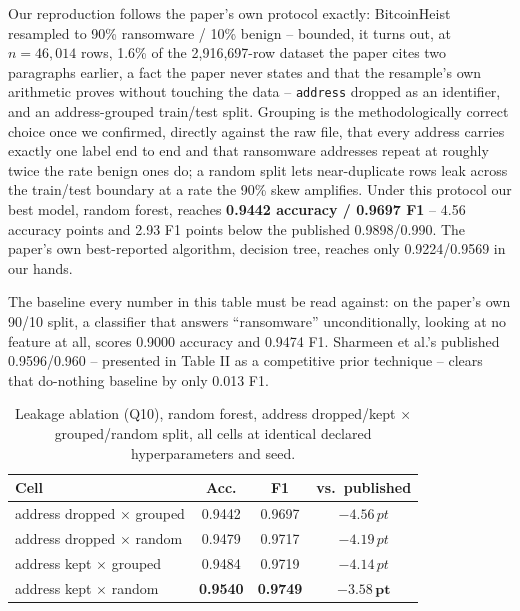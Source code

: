 \documentclass[conference]{IEEEtran}
\newcommand{\pt}{\,pt}
\begin{document}
Our reproduction follows the paper's own protocol exactly: BitcoinHeist resampled to 90\%
ransomware / 10\% benign -- bounded, it turns out, at $n=46{,}014$ rows, 1.6\% of the
2{,}916{,}697-row dataset the paper cites two paragraphs earlier, a fact the paper never states
and that the resample's own arithmetic proves without touching the data -- \texttt{address}
dropped as an identifier, and an address-grouped train/test split. Grouping is the
methodologically correct choice once we confirmed, directly against the raw file, that every
address carries exactly one label end to end and that ransomware addresses repeat at roughly
twice the rate benign ones do; a random split lets near-duplicate rows leak across the train/test
boundary at a rate the 90\% skew amplifies. Under this protocol our best model, random forest,
reaches \textbf{0.9442 accuracy / 0.9697 F1} -- 4.56 accuracy points and 2.93 F1 points below the
published 0.9898/0.990. The paper's own best-reported algorithm, decision tree, reaches only
0.9224/0.9569 in our hands.

The baseline every number in this table must be read against: on the paper's own 90/10 split, a
classifier that answers ``ransomware'' unconditionally, looking at no feature at all, scores
0.9000 accuracy and 0.9474 F1. Sharmeen et al.'s published 0.9596/0.960 -- presented in Table II
as a competitive prior technique -- clears that do-nothing baseline by only 0.013 F1.

\begin{table}[t]
\centering
\caption{Leakage ablation (Q10), random forest, address dropped/kept $\times$ grouped/random
split, all cells at identical declared hyperparameters and seed.}
\label{tab:q10}
\footnotesize
\begin{tabular}{lccc}
\hline
\textbf{Cell} & \textbf{Acc.} & \textbf{F1} & \textbf{vs.\ published} \\
\hline
address dropped $\times$ grouped & 0.9442 & 0.9697 & $-4.56\pt$ \\
address dropped $\times$ random & 0.9479 & 0.9717 & $-4.19\pt$ \\
address kept $\times$ grouped & 0.9484 & 0.9719 & $-4.14\pt$ \\
address kept $\times$ random & \textbf{0.9540} & \textbf{0.9749} & $\mathbf{-3.58\pt}$ \\
\hline
\end{tabular}
\end{table}
\end{document}
